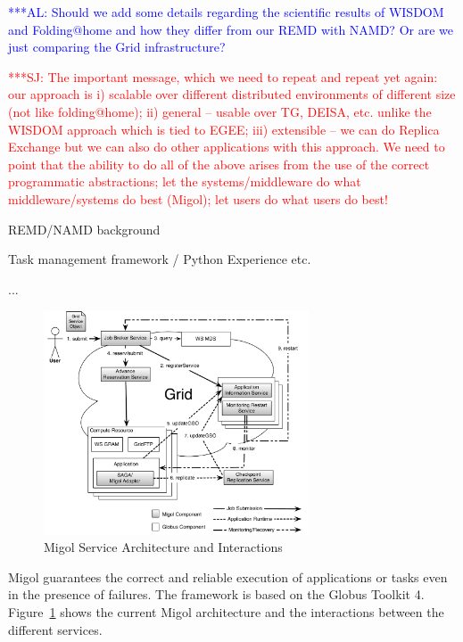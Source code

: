\documentclass[times, 10pt,twocolumn]{article}
\newcommand{\alnote}[1]{ {\textcolor{blue} { ***AL: #1 }}}
\newcommand{\jhanote}[1]{ {\textcolor{red} { ***SJ: #1 }}}
\begin{document}
\alnote{Should we add some  details regarding  the scientific results of WISDOM and Folding@home and how they differ from
our REMD with NAMD? Or are we just comparing the Grid infrastructure?
}  
                       



\jhanote{The important message, which we need to repeat and repeat yet
  again: our approach is i) scalable over different distributed
  environments of different size (not like folding@home); ii) general
  -- usable over TG, DEISA, etc. unlike the WISDOM approach which is
  tied to EGEE; iii) extensible -- we can do Replica Exchange but we
  can also do other applications with this approach. We need to point
  that the ability to do all of the above arises from the use of the
  correct programmatic abstractions; let the systems/middleware do
  what middleware/systems do best (Migol); let users do what users do
  best!}



REMD/NAMD background

Task management framework  / Python Experience etc.

...                                  


\label{sec:migol}

\begin{figure}[t]
            \centering
                \includegraphics[width=0.7\textwidth]{migol_architecture}
            \caption{Migol Service Architecture and Interactions}
            \label{fig:migol_architecture}
\end{figure}           


Migol guarantees the correct and reliable exe\-cution of applications or tasks even in
the presence of  failures. The framework is based on the Globus Toolkit 4. 
Figure~\ref{fig:migol_architecture} shows the current Migol architecture and 
the interactions between the different services.
\end{document}
